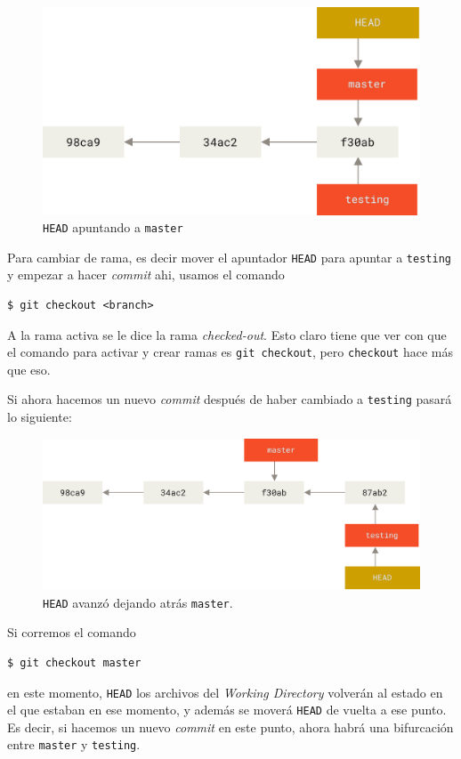 \documentclass[spanish, 12pt, a4paper]{article}
\begin{document}
\begin{figure}[h]
  \centering
  \includegraphics[width=\textwidth]{figs/head-to-master.png}
  \caption{\texttt{HEAD} apuntando a \texttt{master}}
\end{figure}

Para cambiar de rama, es decir mover el apuntador \texttt{HEAD} para apuntar a \texttt{testing} y empezar a hacer \textit{commit} ahi, usamos el comando
\begin{lstlisting}
$ git checkout <branch>
\end{lstlisting}

A la rama activa se le dice la rama \textit{checked-out}.
Esto claro tiene que ver con que el comando para activar y crear ramas es \texttt{git checkout}, pero \texttt{checkout} hace más que eso.

Si ahora hacemos un nuevo \textit{commit} después de haber cambiado a \texttt{testing} pasará lo siguiente:

\begin{figure}[h]
  \centering
  \includegraphics[width=\textwidth]{figs/advance-testing.png}
  \caption{\texttt{HEAD} avanzó dejando atrás \texttt{master}.}
\end{figure}

Si corremos el comando
\begin{lstlisting}
$ git checkout master
\end{lstlisting}
en este momento, \texttt{HEAD} los archivos del \textit{Working Directory} volverán al estado en el que estaban en ese momento, y además se moverá \texttt{HEAD} de vuelta a ese punto.
Es decir, si hacemos un nuevo \textit{commit} en este punto, ahora habrá una bifurcación entre \texttt{master} y \texttt{testing}.
\end{document}
